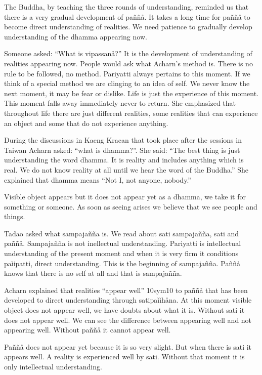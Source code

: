 \documentclass[10pt,a4paper,final]{article}
\begin{document}
The
Buddha, by teaching the three rounds of understanding,
reminded us that there is a very gradual development of paññå. It takes
a long time for paññå to become direct understanding of realities.
We need patience to gradually develop
understanding of the dhamma appearing now.

Someone asked: ``What is vipassanå?'' It is
the development of understanding of realities appearing now. People
would ask what Acharn's method is. There is no rule to be followed, no
method. Pariyatti always pertains to this moment. If we think of a
special method we are clinging to an idea of self. We never know the
next moment, it may be fear or dislike. Life is just the experience of
this moment. This moment falls away immediately never to return. She
emphasized that throughout life there are just different realities, some
realities that can experience an object and some that do not experience
anything.

During the discussions in Kaeng Kracan that
took place after the sessions in Taiwan Acharn asked: ``what is
dhamma?''. She said: ``The best thing is just understanding the word
dhamma. It is reality and includes anything which is real. We do not
know reality at all until we hear the word of the Buddha.'' She
explained that dhamma means ``Not I, not anyone, nobody.'' 

Visible object appears but it does not
appear yet as a dhamma, we take it for something or someone. As soon as
seeing arises we believe that we see people and things. 

Tadao asked what sampajañña is. We read
about sati sampajañña, sati and paññå. Sampajañña is not inellectual
understanding. Pariyatti is intellectual understanding of the present
moment and when it is very firm it conditions paìipatti, direct
understanding. This is the beginning of sampajañña. Paññå knows that
there is no self at all and that is sampajañña.

Acharn explained that realities ``appear
well'' \protect\hyperlinksdfootnote10sym10 to
paññå that has been developed to direct understanding through
satipaììhåna. At this moment visible object does not appear well, we
have doubts about what it is. Without sati it does not appear well. We
can see the difference between appearing well and not appearing well.
Without paññå it cannot appear well. 

Paññå does not appear yet because it is so
very slight. But when there is sati it appears well. A reality is
experienced well by sati. Without that moment it is only intellectual
understanding. 
\end{document}
